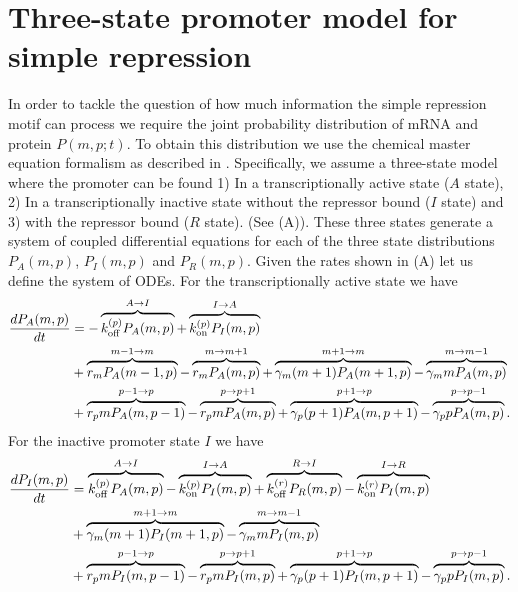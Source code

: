 \section{Three-state promoter model for simple repression}\label{supp_model}

In order to tackle the question of how much information the simple repression
motif can process we require the joint probability distribution of mRNA and
protein $P(m, p; t)$. To obtain this distribution we use the chemical master
equation formalism as described in . Specifically, we assume a
three-state model where the promoter can be found 1) In a transcriptionally
active state  ($A$ state), 2) In a transcriptionally inactive state without the
repressor bound ($I$ state) and 3) with the repressor bound ($R$ state). (See
(A)). These three states generate a system of coupled
differential equations for each of the three state distributions $P_A(m, p)$,
$P_I(m, p)$ and $P_R(m, p)$. Given the rates shown in
(A) let us define the system of ODEs. For the
transcriptionally active state we have
\begin{equation}
  \begin{aligned}
    \dt{P_A(m, p)} &=
    - \overbrace{\kpoff P_A(m, p)}^{A \rightarrow I} %
    + \overbrace{\kpon P_I(m, p)}^{I \rightarrow A}\\ %
    &+ \overbrace{r_m P_A(m-1, p)}^{m-1 \rightarrow m} %
    - \overbrace{r_m P_A(m, p)}^{m \rightarrow m+1}%
    + \overbrace{\gm (m + 1) P_A(m+1 , p)}^{m+1 \rightarrow m} %
    - \overbrace{\gm m P_A(m , p)}^{m \rightarrow m-1}\\ %
    &+ \overbrace{r_p m P_A(m, p - 1)}^{p-1 \rightarrow p} %
    - \overbrace{r_p m P_A(m, p)}^{p \rightarrow p+1} %
    + \overbrace{\gp (p + 1) P_A(m, p + 1)}^{p + 1 \rightarrow p} %
    - \overbrace{\gp p P_A(m, p)}^{p \rightarrow p-1}. %
  \end{aligned}
\end{equation}
For the inactive promoter state $I$ we have
\begin{equation}
  \begin{aligned}
    \dt{P_I(m, p)} &=
    \overbrace{\kpoff P_A(m, p)}^{A \rightarrow I} %
    - \overbrace{\kpon P_I(m, p)}^{I \rightarrow A} %
    + \overbrace{\kroff P_R(m, p)}^{R \rightarrow I} %
    - \overbrace{\kron P_I(m, p)}^{I \rightarrow R}\\ %
    &+ \overbrace{\gm (m + 1) P_I(m+1 , p)}^{m+1 \rightarrow m} %
    - \overbrace{\gm m P_I(m , p)}^{m \rightarrow m-1}\\ %
    &+ \overbrace{r_p m P_I(m, p - 1)}^{p-1 \rightarrow p} %
    - \overbrace{r_p m P_I(m, p)}^{p \rightarrow p+1} %
    + \overbrace{\gp (p + 1) P_I(m, p + 1)}^{p + 1 \rightarrow p} %
    - \overbrace{\gp p P_I(m, p)}^{p \rightarrow p-1}. %
  \end{aligned}
\end{equation}
